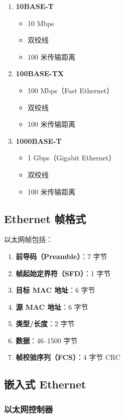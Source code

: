 \begin{enumerate}
  \item \textbf{10BASE-T}
    \begin{itemize}
      \item 10 Mbps
      \item 双绞线
      \item 100 米传输距离
    \end{itemize}

  \item \textbf{100BASE-TX}
    \begin{itemize}
      \item 100 Mbps（Fast Ethernet）
      \item 双绞线
      \item 100 米传输距离
    \end{itemize}

  \item \textbf{1000BASE-T}
    \begin{itemize}
      \item 1 Gbps（Gigabit Ethernet）
      \item 双绞线
      \item 100 米传输距离
    \end{itemize}
\end{enumerate}

\subsection{Ethernet 帧格式}

以太网帧包括：
\begin{enumerate}
  \item \textbf{前导码（Preamble）}：7 字节
  \item \textbf{帧起始定界符（SFD）}：1 字节
  \item \textbf{目标 MAC 地址}：6 字节
  \item \textbf{源 MAC 地址}：6 字节
  \item \textbf{类型/长度}：2 字节
  \item \textbf{数据}：46--1500 字节
  \item \textbf{帧校验序列（FCS）}：4 字节 CRC
\end{enumerate}

\subsection{嵌入式 Ethernet}

\subsubsection{以太网控制器}

